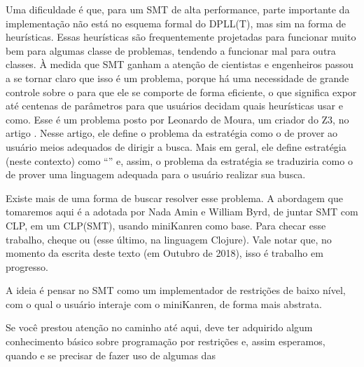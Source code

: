 Uma dificuldade é que, para um  SMT de alta
performance, parte importante da implementação não está no esquema
formal do DPLL(T), mas sim na forma de heurísticas. Essas heurísticas
são frequentemente projetadas para funcionar muito bem para algumas
classe de problemas, tendendo a funcionar mal para outra classes. À
medida que  SMT ganham a atenção de cientistas e
engenheiros passou a se tornar claro que isso é um problema, porque há
uma necessidade de grande controle sobre o  para que
ele se comporte de forma eficiente, o que 
significa expor até centenas de parâmetros para que usuários
decidam quais heurísticas usar e como. Esse é um problema posto por
Leonardo de Moura, um criador do Z3, no artigo \cite{moura}. Nesse
artigo, ele define o problema da estratégia como o de prover ao
usuário meios adequados de dirigir a busca. Mais em geral, ele define
estratégia (neste contexto) como ``''\cite{moura} e, assim, o
problema da estratégia se traduziria como o de prover uma linguagem
adequada para o usuário realizar sua busca.

Existe mais de uma forma de buscar resolver esse problema. A abordagem
que tomaremos aqui é a adotada por Nada Amin e William Byrd, de juntar
SMT com CLP, em um CLP(SMT), usando miniKanren como base. Para checar
esse trabalho, cheque \cite{namin} ou \cite{namim} (esse último, na
linguagem Clojure). Vale notar que, no momento da escrita deste texto
(em Outubro de 2018), isso é trabalho em progresso.

A ideia é pensar no  SMT como um implementador de
restrições de baixo nível, com o qual o usuário interaje com o
miniKanren, de forma mais abstrata.






Se você prestou atenção no caminho até aqui, deve ter adquirido algum
conhecimento básico sobre programação por restrições e, assim
esperamos, quando e se precisar de fazer uso de algumas das 


